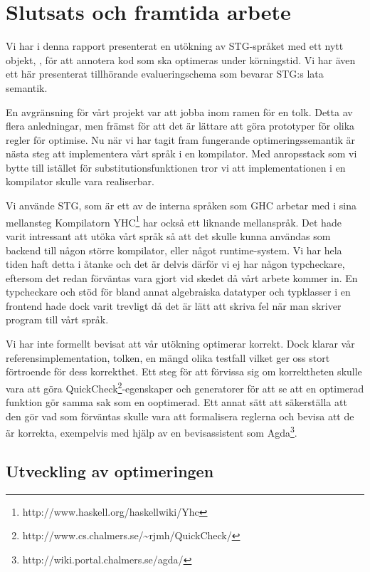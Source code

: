 \documentclass[Rapport]{subfiles}
\begin{document}
\chapter{Slutsats och framtida arbete}

Vi har i denna rapport presenterat en utökning av STG-språket med ett nytt objekt, , för att annotera kod som ska optimeras under körningstid. Vi har även ett här presenterat tillhörande evalueringschema som bevarar STG:s lata semantik. 

En avgränsning för vårt projekt var att jobba inom ramen för en tolk. 
Detta av flera anledningar, men främst för att det är lättare att göra prototyper för 
olika regler för optimise. Nu när vi har tagit fram fungerande optimeringssemantik 
är nästa steg att implementera vårt språk i en kompilator.
Med anropsstack som vi bytte till istället för substitutionsfunktionen tror vi att implementationen
i en kompilator skulle vara realiserbar.


Vi använde STG, som är ett av de interna språken som GHC arbetar med i sina
mellansteg Kompilatorn YHC\footnote{http://www.haskell.org/haskellwiki/Yhc} 
har också ett liknande mellanspråk.
Det hade varit intressant att utöka vårt språk så att det skulle kunna 
användas som backend till någon större kompilator, eller något runtime-system.
Vi har hela tiden haft detta i åtanke och det är delvis därför vi ej har någon 
typcheckare, eftersom det redan förväntas vara gjort vid skedet då vårt arbete kommer in.
En typcheckare och stöd för bland annat algebraiska datatyper och typklasser i en 
frontend hade dock varit trevligt då det är lätt att skriva fel när man skriver
program till vårt språk. 


Vi har inte formellt bevisat att vår utökning optimerar korrekt. Dock klarar vår 
referensimplementation, tolken, en mängd olika testfall vilket ger oss stort förtroende för 
dess korrekthet.
Ett steg för att förvissa sig om korrektheten skulle vara att göra 
QuickCheck\footnote{http://www.cs.chalmers.se/\textasciitilde rjmh/QuickCheck/}-egenskaper 
och generatorer för att se att en optimerad funktion gör samma sak som en ooptimerad. 
Ett annat sätt att säkerställa att den
gör vad som förväntas skulle vara att formalisera reglerna och bevisa
att de är korrekta, exempelvis med hjälp av en bevisassistent som 
Agda\footnote{http://wiki.portal.chalmers.se/agda/}.

\section{Utveckling av optimeringen}
\end{document}
